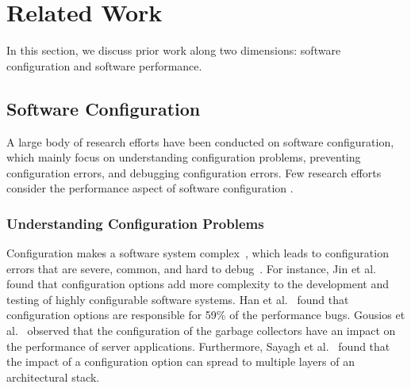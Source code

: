 \section{Related Work}
\label{sec:relatedwork}

In this section, we discuss prior work along two dimensions: software configuration and software performance. %

\subsection{Software Configuration}

A large body of research efforts have been conducted on software configuration, which mainly focus on understanding configuration problems, preventing configuration errors, and debugging configuration errors. Few research efforts consider the performance aspect of software configuration . 

\subsubsection{Understanding Configuration Problems}
Configuration makes a software system complex~\cite{tse}, which leads to configuration errors that are severe, common, and hard to debug~\cite{RN3251}. For instance, Jin et al.~\cite{RN2897} found that configuration options add more complexity to the development and testing of highly configurable software systems. Han et al.~\cite{RN2864} found that configuration options are responsible for 59\% of the performance bugs. Gousios et al.~\cite{RN3551} observed that the configuration of the garbage collectors have an impact on the performance of server applications. Furthermore, Sayagh et al.~\cite{RN3249, RN2758} found that the impact of a configuration option can spread to multiple layers of an architectural stack.%

